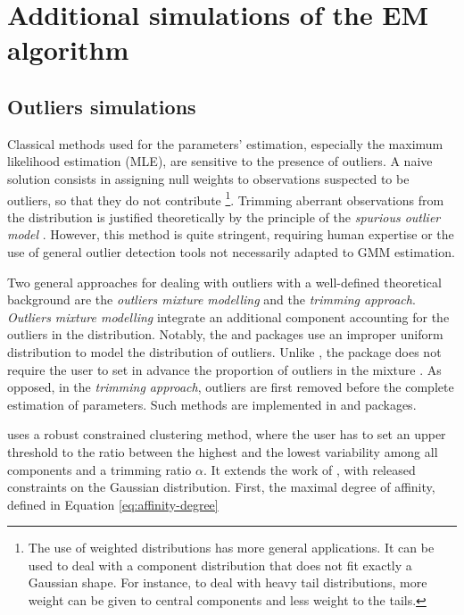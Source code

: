 \chapter{Additional simulations of the EM algorithm}

\section{Outliers simulations}

Classical methods used for the parameters' estimation, especially the
maximum likelihood estimation (MLE), are sensitive to the presence of
outliers. A naive solution consists in assigning null weights to
observations suspected to be outliers, so that they do not contribute
\footnote{The use of weighted distributions has more general applications.
  It can be used to deal with a component distribution that does not
  fit exactly a Gaussian shape. For instance, to deal with heavy tail
  distributions, more weight can be given to central components and
  less weight to the tails.}. Trimming aberrant observations from the distribution is justified
theoretically by the principle of the \emph{spurious outlier model}
\autocite{gallegos_ritter05}. However, this method is quite stringent,
requiring human expertise or the use of general outlier detection tools
not necessarily adapted to GMM estimation.

Two general approaches for dealing with outliers with a well-defined
theoretical background are the \emph{outliers mixture modelling} and the
\emph{trimming approach}. \emph{Outliers mixture modelling} integrate an
additional component accounting for the outliers in the distribution.
Notably, the  \autocite{R-mclust} and  \autocite{R-otrimle}
packages use an improper uniform distribution to model the distribution
of outliers. Unlike , the  package does not
require the user to set in advance the proportion of outliers in the
mixture \autocite{otrimle2016b}. As opposed, in the \emph{trimming approach},
outliers are first removed before the complete estimation of parameters.
Such methods are implemented in  \autocite{R-tclust} and
 \autocite{R-oclust} packages.

 \autocite{R-tclust} uses a robust constrained clustering
method, where the user has to set an upper threshold to the ratio
between the highest and the lowest variability among all components and
a trimming ratio \(\alpha\). It extends the work of
\autocite{garcia-escudero_etal08}, with released constraints on the Gaussian
distribution. First, the maximal degree of affinity, defined in Equation
\eqref{eq:affinity-degree}


